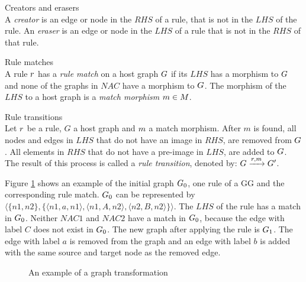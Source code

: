 \begin{definition} Creators and erasers \\
A \textit{creator} is an edge or node in the $\mathit{RHS}$ of a rule, that is not in the $\mathit{LHS}$ of the rule. An \textit{eraser} is an edge or node in the $\mathit{LHS}$ of a rule that is not in the $\mathit{RHS}$ of that rule.
\end{definition}

\vspace{10px}
\begin{definition} Rule matches \\
A rule $r$ has a \textit{rule match} on a host graph $G$ if its $\mathit{LHS}$ has a morphism to $G$ and none of the graphs in $\mathit{NAC}$ have a morphism to $G$. The morphism of the $\mathit{LHS}$ to a host graph is a \textit{match morphism} $m \in M$.
\end{definition}

\vspace{10px}
\begin{definition} Rule transitions \\
Let $r$ be a rule, $G$ a host graph and $m$ a match morphism. After $m$ is found, all nodes and edges in $\mathit{LHS}$ that do not have an image in $\mathit{RHS}$, are removed from $G$. All elements in $\mathit{RHS}$ that do not have a pre-image in $\mathit{LHS}$, are added to $G$. The result of this process is called a \textit{rule transition}, denoted by: $G \xrightarrow{r, m}G'$.
\end{definition}
\vspace{10px}

Figure \ref{fig:gg_example} shows an example of the initial graph $G_0$, one rule of a GG and the corresponding rule match. $G_0$ can be represented by $\langle\{n1,n2\},\{\langle n1,a,n1\rangle, \langle n1,A,n2\rangle,\langle n2,B,n2\rangle\}\rangle$. The $\mathit{LHS}$ of the rule has a match in $G_0$. Neither $\mathit{NAC1}$ and $\mathit{NAC2}$ have a match in $G_0$, because the edge with label $C$ does not exist in $G_0$. The new graph after applying the rule is $G_1$. The edge with label $a$ is removed from the graph and an edge with label $b$ is added with the same source and target node as the removed edge.

\begin{figure}[ht]
  \begin{center}
    
  \end{center}
  \caption{An example of a graph transformation}
  \label{fig:gg_example}
\end{figure}

